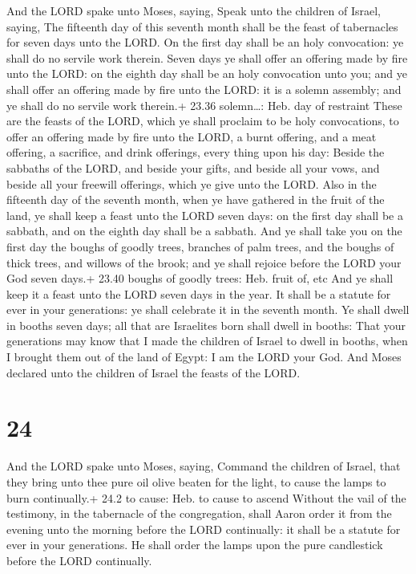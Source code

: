  And the LORD spake unto Moses, saying, 
Speak unto the children of Israel, saying, The fifteenth day of this
seventh month shall be the feast of tabernacles for seven days unto the
LORD.  On the first day shall be an holy convocation: ye
shall do no servile work therein.  Seven days ye shall
offer an offering made by fire unto the LORD: on the eighth day shall be
an holy convocation unto you; and ye shall offer an offering made by
fire unto the LORD: it is a solemn assembly; and ye shall do no servile
work therein.+ 23.36 solemn\ldots: Heb. day of restraint 
These are the feasts of the LORD, which ye shall proclaim to be holy
convocations, to offer an offering made by fire unto the LORD, a burnt
offering, and a meat offering, a sacrifice, and drink offerings, every
thing upon his day:  Beside the sabbaths of the LORD, and
beside your gifts, and beside all your vows, and beside all your
freewill offerings, which ye give unto the LORD.  Also in
the fifteenth day of the seventh month, when ye have gathered in the
fruit of the land, ye shall keep a feast unto the LORD seven days: on
the first day shall be a sabbath, and on the eighth day shall be a
sabbath.  And ye shall take you on the first day the boughs
of goodly trees, branches of palm trees, and the boughs of thick trees,
and willows of the brook; and ye shall rejoice before the LORD your God
seven days.+ 23.40 boughs of goodly trees: Heb. fruit of, etc
 And ye shall keep it a feast unto the LORD seven days in
the year. It shall be a statute for ever in your generations: ye shall
celebrate it in the seventh month.  Ye shall dwell in
booths seven days; all that are Israelites born shall dwell in booths:
 That your generations may know that I made the children of
Israel to dwell in booths, when I brought them out of the land of Egypt:
I am the LORD your God.  And Moses declared unto the
children of Israel the feasts of the LORD.

\hypertarget{section-23}{%
\section{24}\label{section-23}}

 And the LORD spake unto Moses, saying,  Command
the children of Israel, that they bring unto thee pure oil olive beaten
for the light, to cause the lamps to burn continually.+ 24.2 to cause:
Heb. to cause to ascend  Without the vail of the testimony,
in the tabernacle of the congregation, shall Aaron order it from the
evening unto the morning before the LORD continually: it shall be a
statute for ever in your generations.  He shall order the
lamps upon the pure candlestick before the LORD continually.

